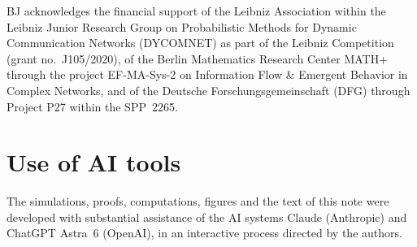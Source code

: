 \documentclass[11pt,letterpaper]{article}
\begin{document}
BJ acknowledges the financial support of the Leibniz Association within the Leibniz Junior Research Group on Probabilistic Methods for Dynamic Communication Networks (DYCOMNET) as part of the Leibniz Competition (grant no.~J105/2020), of the Berlin Mathematics Research Center MATH+ through the project EF-MA-Sys-2 on Information Flow \& Emergent Behavior in Complex Networks, and of the Deutsche Forschungsgemeinschaft (DFG) through Project P27 within the SPP~2265.

\section*{Use of AI tools}

The simulations, proofs, computations, figures and the text of this note were developed with substantial assistance of the AI systems Claude (Anthropic) and ChatGPT Astra~6 (OpenAI), in an interactive process directed by the authors.



\end{document}
